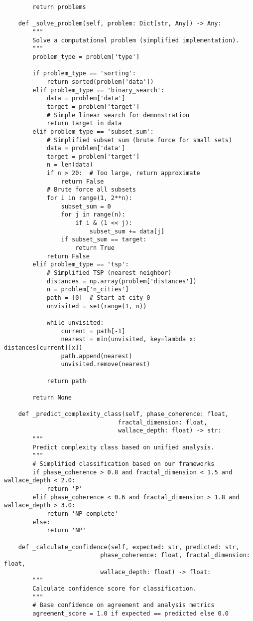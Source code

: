 \documentclass[12pt]{article}
\begin{document}
\begin{lstlisting}
        return problems

    def _solve_problem(self, problem: Dict[str, Any]) -> Any:
        """
        Solve a computational problem (simplified implementation).
        """
        problem_type = problem['type']

        if problem_type == 'sorting':
            return sorted(problem['data'])
        elif problem_type == 'binary_search':
            data = problem['data']
            target = problem['target']
            # Simple linear search for demonstration
            return target in data
        elif problem_type == 'subset_sum':
            # Simplified subset sum (brute force for small sets)
            data = problem['data']
            target = problem['target']
            n = len(data)
            if n > 20:  # Too large, return approximate
                return False
            # Brute force all subsets
            for i in range(1, 2**n):
                subset_sum = 0
                for j in range(n):
                    if i & (1 << j):
                        subset_sum += data[j]
                if subset_sum == target:
                    return True
            return False
        elif problem_type == 'tsp':
            # Simplified TSP (nearest neighbor)
            distances = np.array(problem['distances'])
            n = problem['n_cities']
            path = [0]  # Start at city 0
            unvisited = set(range(1, n))

            while unvisited:
                current = path[-1]
                nearest = min(unvisited, key=lambda x: distances[current][x])
                path.append(nearest)
                unvisited.remove(nearest)

            return path

        return None

    def _predict_complexity_class(self, phase_coherence: float,
                                fractal_dimension: float,
                                wallace_depth: float) -> str:
        """
        Predict complexity class based on unified analysis.
        """
        # Simplified classification based on our frameworks
        if phase_coherence > 0.8 and fractal_dimension < 1.5 and wallace_depth < 2.0:
            return 'P'
        elif phase_coherence < 0.6 and fractal_dimension > 1.8 and wallace_depth > 3.0:
            return 'NP-complete'
        else:
            return 'NP'

    def _calculate_confidence(self, expected: str, predicted: str,
                           phase_coherence: float, fractal_dimension: float,
                           wallace_depth: float) -> float:
        """
        Calculate confidence score for classification.
        """
        # Base confidence on agreement and analysis metrics
        agreement_score = 1.0 if expected == predicted else 0.0


\end{lstlisting}
\end{document}
